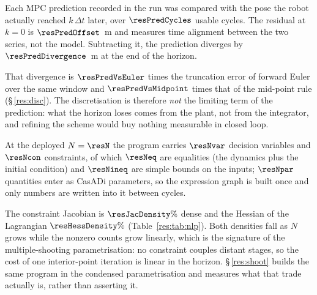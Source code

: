 \begin{table}[htbp]
  \centering
  \small
  \caption{Closed-loop cost with the two integrators, same profile otherwise. A positive $\Delta$ means the mid-point rule is cheaper.}
  \label{res:tab:integloop}
\end{table}

\label{res:pred}


Each MPC prediction recorded in the run was compared with the pose the robot actually reached $k\,\Delta t$ later, over $\resPredCycles$ usable cycles. The residual at $k=0$ is $\resPredOffset$~m and measures time alignment between the two series, not the model. Subtracting it, the prediction diverges by $\resPredDivergence$~m at the end of the horizon.

That divergence is $\resPredVsEuler$ times the truncation error of forward Euler over the same window and $\resPredVsMidpoint$ times that of the mid-point rule (\S\,\ref{res:disc}). The discretisation is therefore \emph{not} the limiting term of the prediction: what the horizon loses comes from the plant, not from the integrator, and refining the scheme would buy nothing measurable in closed loop.

\begin{table}[htbp]
  \centering
  \small
  \caption{Open-loop prediction error along the horizon, over $\resPredCycles$ cycles of the recorded run \resBag.}
  \label{res:tab:pred}
\end{table}

\label{res:nlp}


At the deployed $N=\resN$ the program carries $\resNvar$ decision variables and $\resNcon$ constraints, of which $\resNeq$ are equalities (the dynamics plus the initial condition) and $\resNineq$ are simple bounds on the inputs; $\resNpar$ quantities enter as CasADi parameters, so the expression graph is built once and only numbers are written into it between cycles.

The constraint Jacobian is $\resJacDensity\%$ dense and the Hessian of the Lagrangian $\resHessDensity\%$ (Table~\ref{res:tab:nlp}). Both densities fall as $N$ grows while the nonzero counts grow linearly, which is the signature of the multiple-shooting parametrisation: no constraint couples distant stages, so the cost of one interior-point iteration is linear in the horizon. \S\,\ref{res:shoot} builds the same program in the condensed parametrisation and measures what that trade actually is, rather than asserting it.

